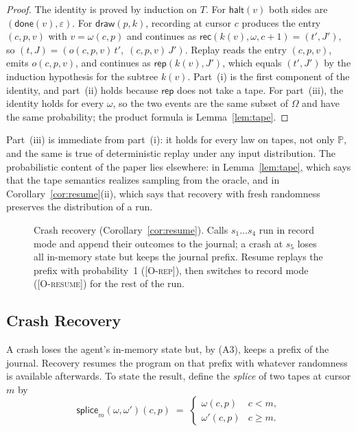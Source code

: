 \begin{proof}
The identity is proved by induction on $T$.
For $\mathsf{halt}(v)$ both sides are $(\mathsf{done}(v), \varepsilon)$.
For $\mathsf{draw}(p, k)$, recording at cursor $c$ produces the entry $(c, p, v)$ with
$v = \omega(c,p)$ and continues as $\mathsf{rec}(k(v), \omega, c+1) = (t', J')$, so
$(t, J) = (o(c,p,v)\,t',\; (c,p,v)\,J')$.
Replay reads the entry $(c, p, v)$, emits $o(c, p, v)$, and continues as
$\mathsf{rep}(k(v), J')$, which equals $(t', J')$ by the induction hypothesis for the subtree
$k(v)$.
Part~(i) is the first component of the identity, and part~(ii) holds because $\mathsf{rep}$
does not take a tape.
For part~(iii), the identity holds for every $\omega$, so the two events are the same subset
of $\Omega$ and have the same probability; the product formula is Lemma~\ref{lem:tape}.
\end{proof}

\noindent
Part~(iii) is immediate from part~(i): it holds for every law on tapes, not only $\mathbb{P}$,
and the same is true of deterministic replay under any input distribution.
The probabilistic content of the paper lies elsewhere: in Lemma~\ref{lem:tape}, which says that
the tape semantics realizes sampling from the oracle, and in Corollary~\ref{cor:resume}(ii),
which says that recovery with fresh randomness preserves the distribution of a run.

\begin{figure}[t]
  \centering
  \fitwidth{}
  \caption{Crash recovery (Corollary~\ref{cor:resume}).
    Calls $s_1 \ldots s_4$ run in record mode and append their outcomes to the journal; a crash
    at $s_5$ loses all in-memory state but keeps the journal prefix. Resume replays the prefix
    with probability~1 (\textsc{[O-rep]}), then switches to record mode
    (\textsc{[O-resume]}) for the rest of the run.}
  \label{fig:crash-recovery}
\end{figure}

\subsection{Crash Recovery}

A crash loses the agent's in-memory state but, by (A3), keeps a prefix of the journal.
Recovery resumes the program on that prefix with whatever randomness is available afterwards.
To state the result, define the \emph{splice} of two tapes at cursor $m$ by
\[
  \mathsf{splice}_m(\omega, \omega')(c, p) \;=\;
  \begin{cases}
    \omega(c, p) & c < m,\\
    \omega'(c, p) & c \geq m.
  \end{cases}
\]

